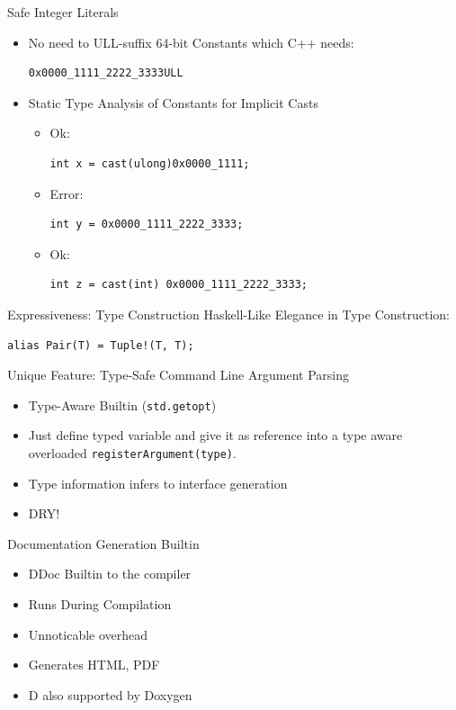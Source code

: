 \documentclass[xcolor=dvipsnames]{beamer}
\begin{document}
\begin{frame}[fragile]{Safe Integer Literals}
  \begin{itemize}[<+->]
  \item No need to ULL-suffix 64-bit Constants which C++ needs:
\begin{lstlisting}[frame=single]
  0x0000_1111_2222_3333ULL
\end{lstlisting}
  \item Static Type Analysis of Constants for Implicit Casts
    \begin{itemize}[<+->]
    \item Ok:
\begin{lstlisting}[frame=single]
int x = cast(ulong)0x0000_1111;
\end{lstlisting}
    \item Error:
\begin{lstlisting}[frame=single]
int y = 0x0000_1111_2222_3333;
\end{lstlisting}
    \item Ok:
\begin{lstlisting}[frame=single]
int z = cast(int) 0x0000_1111_2222_3333;
\end{lstlisting}
    \end{itemize}
  \end{itemize}
\end{frame}

\begin{frame}[fragile]{Expressiveness: Type Construction}
  Haskell-Like Elegance in Type Construction:
\begin{lstlisting}[frame=single]
alias Pair(T) = Tuple!(T, T);
\end{lstlisting}
\end{frame}

\begin{frame}[fragile]{Unique Feature: Type-Safe Command Line Argument Parsing}
  \begin{itemize}[<+->]
  \item Type-Aware Builtin (\texttt{std.getopt})
  \item Just define typed variable and give it as reference into a type aware
    overloaded \texttt{registerArgument(type)}.
  \item Type information infers to interface generation
  \item DRY!
  \end{itemize}
\end{frame}

\begin{frame}[fragile]{Documentation Generation Builtin}
  \begin{itemize}[<+->]
  \item DDoc Builtin to the compiler
  \item Runs During Compilation
  \item Unnoticable overhead
  \item Generates HTML, PDF
  \item D also supported by Doxygen
  \end{itemize}
\end{frame}
\end{document}
